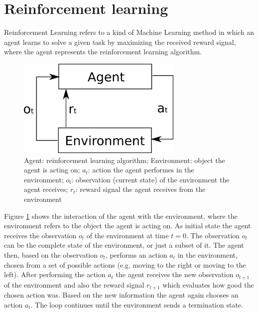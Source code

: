 \section{Reinforcement learning}

Reinforcement Learning refers to a kind of Machine Learning method in which an agent learns to solve a given task by maximizing the received reward signal, where the agent represents the reinforcement learning algorithm.\\


\begin{figure}[H]
  \centering
  \includegraphics[width=300px]{Images/rl_agent.png} 
  \caption{Agent: reinforcement learning algorithm; Environment: object the agent is acting on; $a_t$: action the agent performes in the environment; $o_t$: observation (current state) of the environment the agent receives; $r_t$: reward signal the agent receives from the environment}
  \label{fig:reinforcement_learning}
\end{figure}


Figure \ref{fig:reinforcement_learning} shows the interaction of the agent with the environment, where the environment refers to the object the agent is acting on. As initial state the agent receives the observation $o_t$ of the environment at time $t = 0$. The observation $o_t$ can be the complete state of the environment, or just a subset of it.
The agent then, based on the observation $o_t$, performs an action $a_t$ in the environment, chosen from a set of possible actions (e.g. moving to the right or moving to the left). After performing the action $a_t$ the agent receives the new observation $o_{t+1}$ of the environment and also the reward signal $r_{t+1}$ which evaluates how good the chosen action was.
Based on the new information the agent again chooses an action $a_t$. The loop continues until the environment sends a termination state.\\

